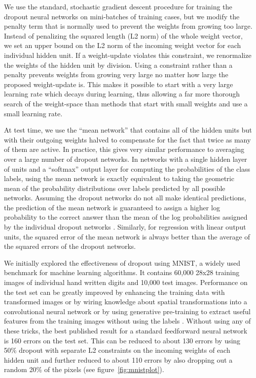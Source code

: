 \documentclass[12pt]{article}
\begin{document}
We use the standard, stochastic gradient descent procedure for training the dropout neural
networks on mini-batches of training cases, but we modify the penalty term that
is normally used to prevent the weights from growing too large. Instead of penalizing the
squared length (L2 norm) of the whole weight vector, we set an upper bound on the L2 norm
of the incoming weight vector for each individual hidden unit. If a weight-update violates
this constraint, we renormalize the weights of the hidden unit by division. Using a
constraint rather than a penalty prevents weights from growing very large no matter how
large the proposed weight-update is. This makes it possible to start with a very large
learning rate which decays during learning, thus allowing a far more thorough search of
the weight-space than methods that start with small weights and use a small learning rate.

At test time, we use the ``mean network'' that contains all of the hidden units but with
their outgoing weights halved to compensate for the fact that twice as many of them are
active.  In practice, this gives very similar performance to averaging over a large number
of dropout networks. In networks with a single hidden layer of  units and a ``softmax''
output layer for computing the probabilities of the class labels, using the mean network
is exactly equivalent to taking the geometric mean of the probability distributions over
labels predicted by all  possible networks.  Assuming the dropout networks do not all
make identical predictions, the prediction of the mean network is guaranteed to assign a
higher log probability to the correct answer than the mean of the log probabilities
assigned by the individual dropout networks \cite{HintonCD}.  Similarly, for regression
with linear output units, the squared error of the mean network is always better than the
average of the squared errors of the dropout networks.

We initially explored the effectiveness of dropout using MNIST, a widely used benchmark
for machine learning algorithms. It contains 60,000 28x28 training images of individual
hand written digits and 10,000 test images. Performance on the test set can be greatly
improved by enhancing the training data with transformed images \cite{Ciresan2011} or by
wiring knowledge about spatial transformations into a convolutional neural network
\cite{Lecun} or by using generative pre-training to extract useful features from the
training images without using the labels \cite{Science}. Without using any of these
tricks, the best published result for a standard feedforward neural network is 160 errors
on the test set. This can be reduced to about 130 errors by using 50\% dropout with
separate L2 constraints on the incoming weights of each hidden unit and further reduced to
about 110 errors by also dropping out a random 20\% of the pixels (see figure~\ref{fig:mnistplot}).
\end{document}
